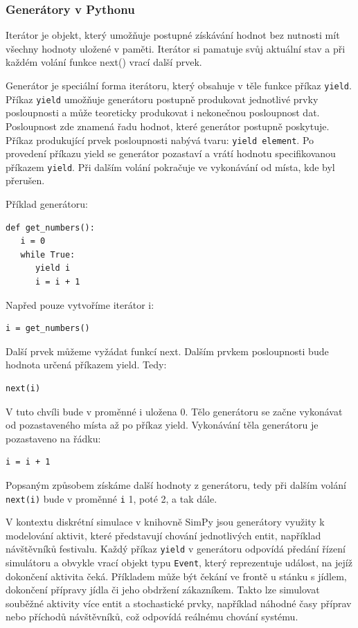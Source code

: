 \documentclass[
  program=itp,
  biblatex,
  figures=false,
  glossaries,
  index
]{kidiplom}
\begin{document}
\subsubsection{Generátory v Pythonu}
Iterátor je objekt, který umožňuje postupné získávání hodnot bez nutnosti mít všechny hodnoty uložené v paměti. Iterátor si pamatuje svůj aktuální stav a při každém volání funkce next() vrací další prvek.

Generátor je speciální forma iterátoru, který obsahuje v těle funkce příkaz \texttt{yield}. Příkaz \texttt{yield} umožňuje generátoru postupně produkovat jednotlivé prvky posloupnosti a může teoreticky produkovat i nekonečnou posloupnost dat. Posloupnost zde znamená řadu hodnot, které generátor postupně poskytuje. Příkaz produkující prvek posloupnosti nabývá tvaru: \texttt{yield element}. Po provedení příkazu yield se generátor pozastaví a vrátí hodnotu specifikovanou příkazem \texttt{yield}. Při dalším volání pokračuje ve vykonávání od místa, kde byl přerušen.

\noindent Příklad generátoru:
 \begin{verbatim} 
def get_numbers():
   i = 0
   while True:
      yield i
      i = i + 1
\end{verbatim}
Napřed pouze vytvoříme iterátor i: 
 \begin{verbatim} 
i = get_numbers()
\end{verbatim}
Další prvek můžeme vyžádat funkcí next. 
Dalším prvkem posloupnosti bude hodnota určená příkazem yield. Tedy:
 \begin{verbatim} 
next(i)
\end{verbatim}
V tuto chvíli bude v proměnné i uložena 0. Tělo generátoru se začne vykonávat od pozastaveného místa až po příkaz yield.  Vykonávání těla generátoru je pozastaveno na řádku:
 \begin{verbatim} 
i = i + 1
\end{verbatim}
Popsaným způsobem získáme další hodnoty z generátoru, tedy při dalším volání \texttt{next(i)} bude v proměnné \texttt{i} 1, poté 2, a tak dále.

V kontextu diskrétní simulace v knihovně SimPy jsou generátory využity k modelování aktivit, které představují chování jednotlivých entit, například návštěvníků festivalu. Každý příkaz \texttt{yield} v generátoru odpovídá předání řízení simulátoru a obvykle vrací objekt typu \texttt{Event}, který reprezentuje událost, na jejíž dokončení aktivita čeká. Příkladem může být čekání ve frontě u stánku s jídlem, dokončení přípravy jídla či jeho obdržení zákazníkem. Takto lze simulovat souběžné aktivity více entit a stochastické prvky, například náhodné časy příprav nebo příchodů návštěvníků, což odpovídá reálnému chování systému.
\end{document}
